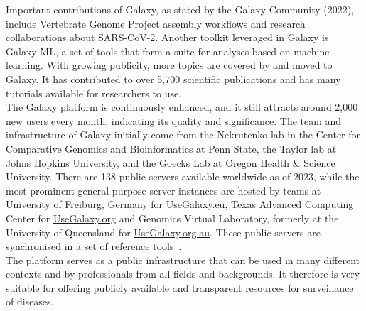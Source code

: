 Important contributions of Galaxy, as stated by the Galaxy Community (2022), include Vertebrate Genome Project assembly workflows and research collaborations about \ac{SARS-CoV-2}. Another toolkit leveraged in Galaxy is Galaxy-ML, a set of tools that form a suite for analyses based on machine learning. With growing publicity, more topics are covered by and moved to Galaxy. It has contributed to over 5,700 scientific publications and has many tutorials available for researchers to use. \\
The Galaxy platform is continuously enhanced, and it still attracts around 2,000 new users every month, indicating its quality and significance. The team and infrastructure of Galaxy initially come from the Nekrutenko lab in the Center for Comparative Genomics and Bioinformatics at Penn State, the Taylor lab at Johns Hopkins University, and the Goecks Lab at Oregon Health \& Science University. There are 138 public servers available worldwide as of 2023, while the most prominent general-purpose server instances are hosted by teams at University of Freiburg, Germany for \href{https://usegalaxy.eu/}{UseGalaxy.eu}, Texas Advanced Computing Center for \href{https://usegalaxy.org/}{UseGalaxy.org} and Genomics Virtual Laboratory, formerly at the University of Queensland for \href{https://usegalaxy.org.au/}{UseGalaxy.org.au}. These public servers are synchronised in a set of reference tools~\cite{10.1093/nar/gkac247}. \\
The platform serves as a public infrastructure that can be used in many different contexts and by professionals from all fields and backgrounds. It therefore is very suitable for offering publicly available and transparent resources for surveillance of diseases.

